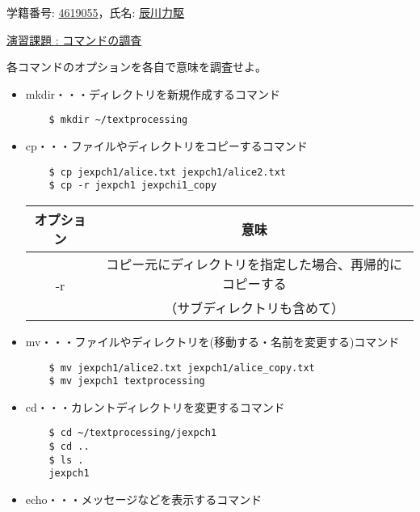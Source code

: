 \documentclass[a4paper,12pt]{jarticle}
\begin{document}
\begin{center}
    学籍番号: \underline{4619055}，氏名: \underline{辰川力駆}
\end{center}

\underline{\Large 演習課題 : コマンドの調査}

各コマンドのオプションを各自で意味を調査せよ。

\begin{itemize}
    \item mkdir・・・ディレクトリを新規作成するコマンド
          \begin{lstlisting}
    $ mkdir ~/textprocessing
        \end{lstlisting}
    \item cp・・・ファイルやディレクトリをコピーするコマンド
          \begin{lstlisting}
    $ cp jexpch1/alice.txt jexpch1/alice2.txt
    $ cp -r jexpch1 jexpchi1_copy
            \end{lstlisting}
          \begin{table}[h]
              \begin{center}
                  \begin{tabular}{|c|c|} \hline
                      オプション          & 意味                                                     \\ \hline
                      \multirow{2}{*}{-r} & コピー元にディレクトリを指定した場合、再帰的にコピーする \\
                                          & （サブディレクトリも含めて）                             \\ \hline
                  \end{tabular}
              \end{center}
          \end{table}
    \item mv・・・ファイルやディレクトリを(移動する・名前を変更する)コマンド
          \begin{lstlisting}
    $ mv jexpch1/alice2.txt jexpch1/alice_copy.txt
    $ mv jexpch1 textprocessing
            \end{lstlisting}
    \item cd・・・カレントディレクトリを変更するコマンド
          \begin{lstlisting}
    $ cd ~/textprocessing/jexpch1
    $ cd ..
    $ ls .
    jexpch1
            \end{lstlisting}
    \item echo・・・メッセージなどを表示するコマンド

\end{itemize}
\end{document}
